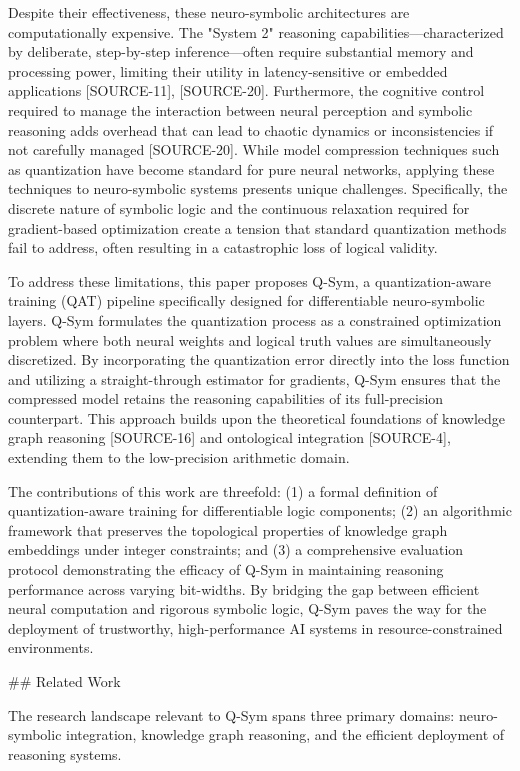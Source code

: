 \documentclass{article}
\begin{document}
Despite their effectiveness, these neuro-symbolic architectures are computationally expensive. The "System 2" reasoning capabilities—characterized by deliberate, step-by-step inference—often require substantial memory and processing power, limiting their utility in latency-sensitive or embedded applications [SOURCE-11], [SOURCE-20]. Furthermore, the cognitive control required to manage the interaction between neural perception and symbolic reasoning adds overhead that can lead to chaotic dynamics or inconsistencies if not carefully managed [SOURCE-20]. While model compression techniques such as quantization have become standard for pure neural networks, applying these techniques to neuro-symbolic systems presents unique challenges. Specifically, the discrete nature of symbolic logic and the continuous relaxation required for gradient-based optimization create a tension that standard quantization methods fail to address, often resulting in a catastrophic loss of logical validity.

To address these limitations, this paper proposes Q-Sym, a quantization-aware training (QAT) pipeline specifically designed for differentiable neuro-symbolic layers. Q-Sym formulates the quantization process as a constrained optimization problem where both neural weights and logical truth values are simultaneously discretized. By incorporating the quantization error directly into the loss function and utilizing a straight-through estimator for gradients, Q-Sym ensures that the compressed model retains the reasoning capabilities of its full-precision counterpart. This approach builds upon the theoretical foundations of knowledge graph reasoning [SOURCE-16] and ontological integration [SOURCE-4], extending them to the low-precision arithmetic domain.

The contributions of this work are threefold: (1) a formal definition of quantization-aware training for differentiable logic components; (2) an algorithmic framework that preserves the topological properties of knowledge graph embeddings under integer constraints; and (3) a comprehensive evaluation protocol demonstrating the efficacy of Q-Sym in maintaining reasoning performance across varying bit-widths. By bridging the gap between efficient neural computation and rigorous symbolic logic, Q-Sym paves the way for the deployment of trustworthy, high-performance AI systems in resource-constrained environments.

\#\# Related Work

The research landscape relevant to Q-Sym spans three primary domains: neuro-symbolic integration, knowledge graph reasoning, and the efficient deployment of reasoning systems.
\end{document}
